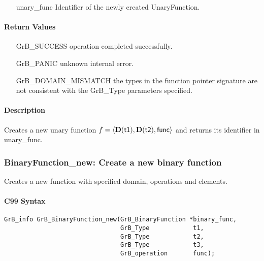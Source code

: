 \begin{itemize}[leftmargin=1.1in]
    \item[{\sf unary\_func}] Identifier of the newly created UnaryFunction.
\end{itemize}

\paragraph{Return Values}

\begin{itemize}[leftmargin=2.1in]
\item[{\sf GrB\_SUCCESS}]           operation completed successfully.
\item[{\sf GrB\_PANIC}]             unknown internal error.
\item[{\sf GrB\_DOMAIN\_MISMATCH}]  the types in the function pointer signature are not   
                                    consistent with the {\sf GrB\_Type} parameters specified.
\end{itemize}

\paragraph{Description}

Creates a new unary function $f = \langle \bold{D}({\sf t1}), \bold{D}({\sf t2}), {\sf func} \rangle$ and returns its identifier in {\sf unary\_func}.


\subsubsection{{\sf BinaryFunction\_new}: Create a new binary function}

Creates a new function with specified domain, operations and elements.

\paragraph{C99 Syntax}

\begin{verbatim}
GrB_info GrB_BinaryFunction_new(GrB_BinaryFunction *binary_func,
                                GrB_Type            t1,
                                GrB_Type            t2,
                                GrB_Type            t3,
                                GrB_operation       func);
\end{verbatim}

